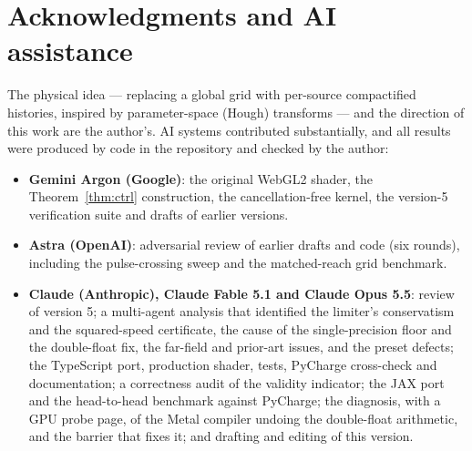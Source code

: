\documentclass[11pt, a4paper]{article}
\begin{document}
\section*{Acknowledgments and AI assistance}
The physical idea --- replacing a global grid with per-source compactified histories, inspired by parameter-space (Hough) transforms --- and the direction of this work are the author's. AI systems contributed substantially, and all results were produced by code in the repository and checked by the author:
\begin{itemize}
    \item \textbf{Gemini Argon (Google)}:
    the original WebGL2 shader, the Theorem~\ref{thm:ctrl} construction, the cancellation-free kernel, the version-5 verification suite and drafts of earlier versions.
    \item \textbf{Astra (OpenAI)}:
    adversarial review of earlier drafts and code (six rounds), including the pulse-crossing sweep and the matched-reach grid benchmark.
    \item \textbf{Claude (Anthropic), Claude Fable 5.1 and Claude Opus 5.5}: review of version 5; a multi-agent analysis that identified the limiter's conservatism and the squared-speed certificate, the cause of the single-precision floor and the double-float fix, the far-field and prior-art issues, and the preset defects; the TypeScript port, production shader, tests, PyCharge cross-check and documentation; a correctness audit of the validity indicator; the JAX port and the head-to-head benchmark against PyCharge; the diagnosis, with a GPU probe page, of the Metal compiler undoing the double-float arithmetic, and the barrier that fixes it; and drafting and editing of this version.
\end{itemize}
\end{document}
